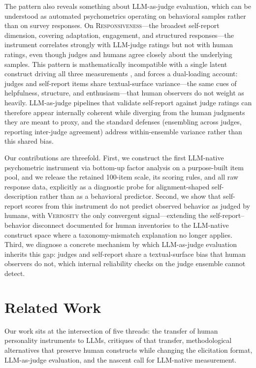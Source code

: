 \documentclass[11pt]{article}
\newcommand{\factorname}[1]{\textsc{#1}}
\newcommand{\nretained}{100}
\begin{document}
The pattern also reveals something about LLM-as-judge evaluation, which can be understood as automated psychometrics operating on behavioral samples rather than on survey responses.
On \factorname{Responsiveness}---the broadest self-report dimension, covering adaptation, engagement, and structured responses---the instrument correlates strongly with LLM-judge ratings but not with human ratings, even though judges and humans agree closely about the underlying samples.
This pattern is mathematically incompatible with a single latent construct driving all three measurements \citep{zheng2023judging}, and forces a dual-loading account: judges and self-report items share textual-surface variance---the same cues of helpfulness, structure, and enthusiasm---that human observers do not weight as heavily.
LLM-as-judge pipelines that validate self-report against judge ratings can therefore appear internally coherent while diverging from the human judgments they are meant to proxy, and the standard defenses (ensembling across judges, reporting inter-judge agreement) address within-ensemble variance rather than this shared bias.

Our contributions are threefold.
First, we construct the first LLM-native psychometric instrument via bottom-up factor analysis on a purpose-built item pool, and we release the retained \nretained{}-item scale, its scoring rules, and all raw response data, explicitly as a diagnostic probe for alignment-shaped self-description rather than as a behavioral predictor.
Second, we show that self-report scores from this instrument do not predict observed behavior as judged by humans, with \factorname{Verbosity} the only convergent signal---extending the self-report--behavior disconnect documented for human inventories \citep{li2024psychometrics} to the LLM-native construct space where a taxonomy-mismatch explanation no longer applies.
Third, we diagnose a concrete mechanism by which LLM-as-judge evaluation inherits this gap: judges and self-report share a textual-surface bias that human observers do not, which internal reliability checks on the judge ensemble cannot detect.

\section{Related Work}
\label{sec:related}

Our work sits at the intersection of five threads: the transfer of human personality instruments to LLMs, critiques of that transfer, methodological alternatives that preserve human constructs while changing the elicitation format, LLM-as-judge evaluation, and the nascent call for LLM-native measurement.
\end{document}
